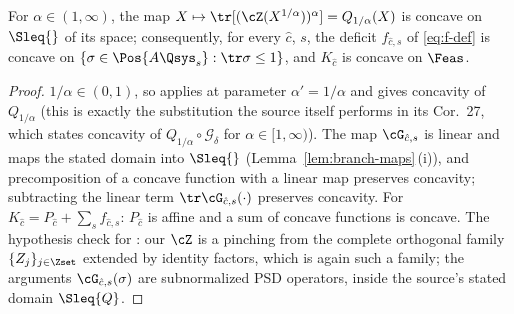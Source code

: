 
\begin{corollary}
\label{cor:concavity}
For $\alpha\in(1,\infty)$, the map
$X\mapsto\tr[(\cZ(X^{1/\alpha}))^{\alpha}]=Q_{1/\alpha}(X)$ is concave on
$\Sleq{}$ of its space; consequently, for every $\hat c$, $s$, the deficit
$f_{\hat c,s}$ of \eqref{eq:f-def} is concave on
$\{\sigma\in\Pos{A\Qsys_s}:\tr\sigma\le1\}$, and
$K_{\hat c}$ is concave on $\Feas$.
\end{corollary}

\begin{proof}
$1/\alpha\in(0,1)$, so  applies at parameter
$\alpha'=1/\alpha$ and gives concavity of $Q_{1/\alpha}$ (this is
exactly the substitution the source itself performs in its Cor.~27, which
states concavity of $Q_{1/\alpha}\circ\mathcal{G}_{\delta}$ for
$\alpha\in[1,\infty)$). The map $\cG_{\hat c,s}$ is linear and maps the
stated domain into $\Sleq{}$ (Lemma~\ref{lem:branch-maps}\,(i)), and precomposition
of a concave function with a linear map preserves concavity; subtracting
the linear term $\tr\cG_{\hat c,s}(\cdot)$ preserves concavity. For
$K_{\hat c}=P_{\hat c}+\sum_sf_{\hat c,s}$: $P_{\hat c}$ is affine and a
sum of concave functions is concave. The hypothesis check for
: our $\cZ$ is a pinching from the complete
orthogonal family $\{Z_j\}_{j\in\Zset}$ extended by identity factors, which
is again such a family; the arguments $\cG_{\hat c,s}(\sigma)$ are
subnormalized PSD operators, inside the source's stated domain
$\Sleq{Q}$.
\end{proof}
